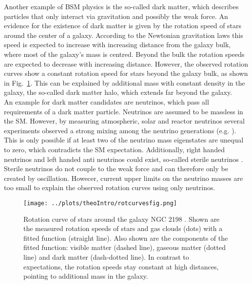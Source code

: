 \noindent Another example of BSM physics is the so-called dark matter, which describes particles that only interact via gravitation and possibly the weak force. An evidence for the existence of dark matter is given by the rotation speed of stars around the center of a galaxy. According to the Newtonian gravitation laws this speed is expected to increase with increasing distance from the galaxy bulk, where most of the galaxy's mass is centred. Beyond the bulk the rotation speeds are expected to decrease with increasing distance. However, the observed rotation curves show a constant rotation speed for stars beyond the galaxy bulk, as shown in Fig.~\ref{fig:theo:rotcurves}. This can be explained by additional mass with constant density in the galaxy, the so-called dark matter halo, which extends far beyond the galaxy.\\ 
 
\noindent An example for dark matter candidates are neutrinos, which pass all requirements of a dark matter particle. Neutrinos are assumed to be massless in the SM. However, by measuring atmospheric, solar and reactor neutrinos several experiments observed a strong mixing among the neutrino generations (e.g. \cite{nuoszi1,nuoszi2,nuoszi3,nuoszi4}). This is only possible if at least two of the neutrino mass eigenstates are unequal to zero, which contradicts the SM expectation. Additionally, right handed neutrinos and left handed anti neutrinos could exist, so-called sterile neutrinos \cite{sterilenu}. Sterile neutrinos do not couple to the weak force and can therefore only be created by oscillation. Howecer, current upper limits on the neutrino masses are too small \cite{numasses1,numasses2} to explain the observed rotation curves using only neutrinos.\\

\begin{figure}
	\centering
	\texttt{[image: ../plots/theoIntro/rotcurvesfig.png]}
	\caption[Rotation curve of stars around the galaxy NGC 2198]{Rotation curve of stars around the galaxy NGC 2198 \cite{rotcurves}. Shown are the measured rotation speeds of stars and gas clouds (dots) with a fitted function (straight line). Also shown are the components of the fitted function: visible matter (dashed line), gaseous matter (dotted line) and dark matter (dash-dotted line). In contrast to expectations, the rotation speeds stay constant at high distances, pointing to additional mass in the galaxy.}
	\label{fig:theo:rotcurves}
\end{figure}

